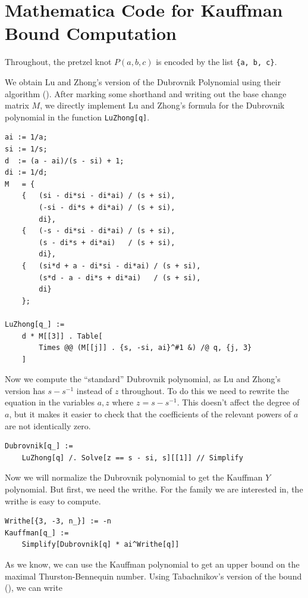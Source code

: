 \chapter{Mathematica Code for Kauffman Bound Computation}\label{ch:appendix}

\lstset{language=Mathematica,style=better}

Throughout, the pretzel knot $P(a, b, c)$ is encoded by the list \lstinline|{a, b, c}|.

We obtain Lu and Zhong's version of the Dubrovnik Polynomial using their algorithm (\cite{lu-zhong}).
After marking some shorthand and writing out the base change matrix $M$, we directly implement Lu and Zhong's formula for the Dubrovnik polynomial in the function \lstinline|LuZhong[q]|.

\begin{lstlisting}
ai := 1/a;
si := 1/s;
d  := (a - ai)/(s - si) + 1;
di := 1/d;
M   = {
    {   (si - di*si - di*ai) / (s + si),
        (-si - di*s + di*ai) / (s + si),
        di},
    {   (-s - di*si - di*ai) / (s + si),
        (s - di*s + di*ai)   / (s + si),
        di},
    {   (si*d + a - di*si - di*ai) / (s + si),
        (s*d - a - di*s + di*ai)   / (s + si),
        di}
    };

LuZhong[q_] :=
    d * M[[3]] . Table[
        Times @@ (M[[j]] . {s, -si, ai}^#1 &) /@ q, {j, 3}
    ]
\end{lstlisting}

Now we compute the ``standard'' Dubrovnik polynomial, as Lu and Zhong's version has $s - s^{-1}$ instead of $z$ throughout. To do this we need to rewrite the equation in the variables $a, z$ where $z = s - s^{-1}$. This doesn't affect the degree of $a$, but it makes it easier to check that the coefficients of the relevant powers of $a$ are not identically zero.

\begin{lstlisting}
Dubrovnik[q_] :=
 	LuZhong[q] /. Solve[z == s - si, s][[1]] // Simplify
\end{lstlisting}

Now we will normalize the Dubrovnik polynomial to get the Kauffman $Y$ polynomial. But first, we need the writhe. For the family we are interested in, the writhe is easy to compute.

\begin{lstlisting}
Writhe[{3, -3, n_}] := -n
Kauffman[q_] :=
    Simplify[Dubrovnik[q] * ai^Writhe[q]]
\end{lstlisting}

As we know, we can use the Kauffman polynomial to get an upper bound on the maximal Thurston-Bennequin number. Using Tabachnikov's version of the bound (\cite{tabachnikov}), we can write

